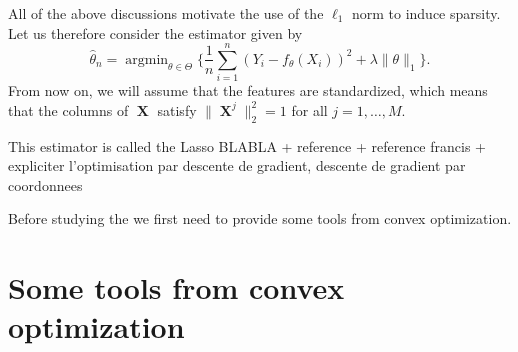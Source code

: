 \documentclass[
	fontsize=11pt, %
	twoside=false, %
	numbers=noenddot, %
]{kaobook}
\DeclareMathOperator{\bX}{{\boldsymbol X}}
\DeclareMathOperator*{\argmin}{argmin}
\newcommand{\wh}{\widehat}
\newcommand{\norm}[1]{\| #1 \|}
\begin{document}

All of the above discussions motivate the use of the $\ell_1$ norm to induce sparsity.
Let us therefore consider the estimator given by
\begin{equation}
	\label{eq:lasso-def2}
	\wh \theta_n = \argmin_{\theta \in \Theta} \Big\{ 
	\frac 1n \sum_{i=1}^n (Y_i - f_\theta(X_i))^2 
	+ \lambda \norm{\theta}_1 
	\Big\}.
\end{equation}
From now on, we will assume that the features are standardized, which means that the columns of $\bX$ satisfy $\norm{\bX^j}_2^2 = 1$ for all $j=1, \ldots, M$.

This estimator is called the Lasso BLABLA + reference + reference francis + expliciter l'optimisation par descente de gradient, descente de gradient par coordonnees

Before studying the we first need to provide some tools from convex optimization.


\section{Some tools from convex optimization} %
\label{sec:some_tools_from_convex_optimization}

\end{document}
